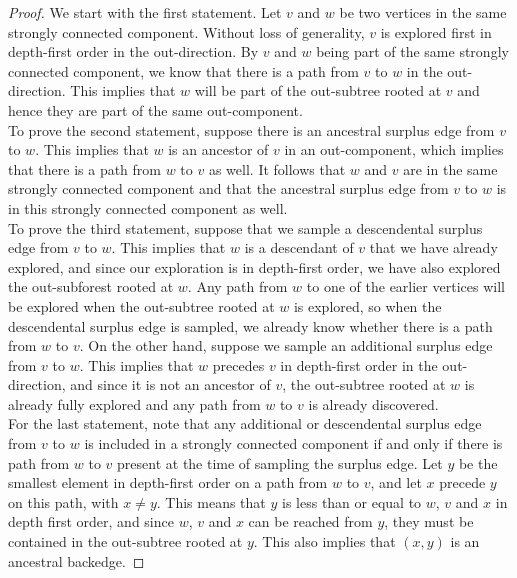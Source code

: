 \begin{proof}
We start with the first statement. Let $v$ and $w$ be two vertices in the same strongly connected component. Without loss of generality, $v$ is explored first in depth-first order in the out-direction. By $v$ and $w$ being part of the same strongly connected component, we know that there is a path from $v$ to $w$ in the out-direction. This implies that $w$ will be part of the out-subtree rooted at $v$ and hence they are part of the same out-component. \\
To prove the second statement, suppose there is an ancestral surplus edge from $v$ to $w$. This implies that $w$ is an ancestor of $v$ in an out-component, which implies that there is a path from $w$ to $v$ as well. It follows that $w$ and $v$ are in the same strongly connected component and that the ancestral surplus edge from $v$ to $w$ is in this strongly connected component as well. \\
To prove the third statement, suppose that we sample a descendental surplus edge from $v$ to $w$. This implies that $w$ is a descendant of $v$ that we have already explored, and since our exploration is in depth-first order, we have also explored the out-subforest rooted at $w$. Any path from $w$ to one of the earlier vertices will be explored when the out-subtree rooted at $w$ is explored, so when the descendental surplus edge is sampled, we already know whether there is a path from $w$ to $v$. On the other hand, suppose we sample an additional surplus edge from $v$ to $w$. This implies that $w$ precedes $v$ in depth-first order in the out-direction, and since it is not an ancestor of $v$, the out-subtree rooted at $w$ is already fully explored and any path from $w$ to $v$ is already discovered. \\
For the last statement, note that any additional or descendental surplus edge from $v$ to $w$ is included in a strongly connected component if and only if there is path from $w$ to $v$ present at the time of sampling the surplus edge. Let $y$ be the smallest element in depth-first order on a path from $w$ to $v$, and let $x$ precede $y$ on this path, with $x\neq y$. This means that $y$ is less than or equal to $w$, $v$ and $x$ in depth first order, and since $w$, $v$ and $x$ can be reached from $y$, they must be contained in the out-subtree rooted at $y$. This also implies that $(x,y)$ is an ancestral backedge.
\end{proof}

